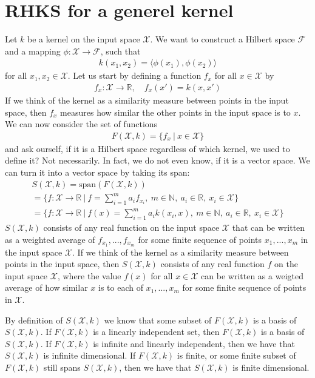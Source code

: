 \documentclass[12pt]{article}
\begin{document}
\section{RHKS for a generel kernel}

Let $k$ be a kernel on the input space $\mathcal{X}$. We want to construct a Hilbert space $\mathcal{F}$ and a mapping $\phi: \mathcal{X} \to \mathcal{F}$, such that 
\begin{align}
k(x_1,x_2)=\langle\phi(x_1),\phi(x_2) \rangle
\end{align}
for all $x_1,x_2 \in \mathcal{X}$. Let us start by defining a function $f_x$ for all $x \in \mathcal{X}$ by
\begin{align}
f_{x}:\mathcal{X} \to \mathbb{R}, \quad f_x(x') = k(x,x')
\end{align}
If we think of the kernel as a similarity measure between points in the input space, then $f_x$ measures how similar the other points in the input space is to $x$. We can now consider the set of functions
\begin{align}
F(\mathcal{X}, k) = \{f_x\ |\ x\in \mathcal{X} \}
\end{align}
and ask ourself, if it is a Hilbert space regardless of which kernel, we used to define it? Not necessarily. In fact, we do not even know, if it is a vector space. We can turn it into a vector space by taking its span:
\begin{align}
S(\mathcal{X},k) = \text{span}(F(\mathcal{X}, k)) \\ = 
\{f: \mathcal{X}\to \mathbb{R}\ |\ f =  \sum_{i=1}^m a_i f_{x_i},\ m\in \mathbb{N},\ a_i\in \mathbb{R},\ x_i \in \mathcal{X} \} \\ =
\{f: \mathcal{X}\to \mathbb{R}\ |\ f(x) =  \sum_{i=1}^m a_i k(x_i,x),\ m\in \mathbb{N},\ a_i\in \mathbb{R},\ x_i \in \mathcal{X} \}
\end{align}
$S(\mathcal{X},k)$ consists of any real function on the input space $\mathcal{X}$ that can be written as a weighted average of $f_{x_1},...,f_{x_m}$ for some finite sequence of points $x_1,...,x_m$ in the input space $\mathcal{X}$. If we think of the kernel as a similarity measure between points in the input space, then $S(\mathcal{X},k)$ consists of any real function $f$ on the input space $\mathcal{X}$, where the value $f(x)$ for all $x\in \mathcal{X}$ can be written as a weigted average of how similar $x$ is to each of $x_1,...,x_m$ for some finite sequence of points in $\mathcal{X}$.

By definition of $S(\mathcal{X},k)$ we know that some subset of $F(\mathcal{X},k)$ is a basis of $S(\mathcal{X},k)$. If $F(\mathcal{X},k)$ is a linearly independent set, then $F(\mathcal{X},k)$ is a basis of $S(\mathcal{X},k)$. If $F(\mathcal{X},k)$ is infinite and linearly independent, then we have that $S(\mathcal{X},k)$ is infinite dimensional. If $F(\mathcal{X},k)$ is finite, or some finite subset of $F(\mathcal{X},k)$ still spans $S(\mathcal{X},k)$, then we have that $S(\mathcal{X},k)$ is finite dimensional.
\end{document}
